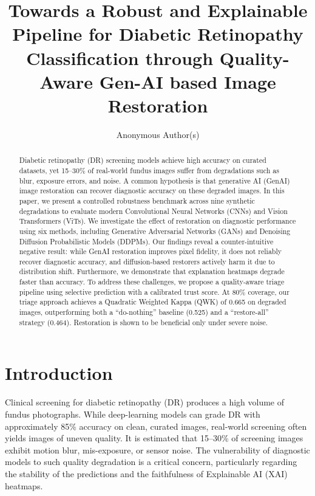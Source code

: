 \documentclass[runningheads]{llncs}
\begin{document}
\title{Towards a Robust and Explainable Pipeline for Diabetic Retinopathy Classification through Quality-Aware Gen-AI based Image Restoration}

\author{Anonymous Author(s)}

\maketitle

\begin{abstract}
Diabetic retinopathy (DR) screening models achieve high accuracy on curated datasets, yet 15--30\% of real-world fundus images suffer from degradations such as blur, exposure errors, and noise. A common hypothesis is that generative AI (GenAI) image restoration can recover diagnostic accuracy on these degraded images. In this paper, we present a controlled robustness benchmark across nine synthetic degradations to evaluate modern Convolutional Neural Networks (CNNs) and Vision Transformers (ViTs). We investigate the effect of restoration on diagnostic performance using six methods, including Generative Adversarial Networks (GANs) and Denoising Diffusion Probabilistic Models (DDPMs). Our findings reveal a counter-intuitive negative result: while GenAI restoration improves pixel fidelity, it does not reliably recover diagnostic accuracy, and diffusion-based restorers actively harm it due to distribution shift. Furthermore, we demonstrate that explanation heatmaps degrade faster than accuracy. To address these challenges, we propose a quality-aware triage pipeline using selective prediction with a calibrated trust score. At 80\% coverage, our triage approach achieves a Quadratic Weighted Kappa (QWK) of 0.665 on degraded images, outperforming both a ``do-nothing'' baseline (0.525) and a ``restore-all'' strategy (0.464). Restoration is shown to be beneficial only under severe noise.

\end{abstract}

\section{Introduction}
Clinical screening for diabetic retinopathy (DR) produces a high volume of fundus photographs. While deep-learning models can grade DR with approximately 85\% accuracy on clean, curated images, real-world screening often yields images of uneven quality. It is estimated that 15--30\% of screening images exhibit motion blur, mis-exposure, or sensor noise. The vulnerability of diagnostic models to such quality degradation is a critical concern, particularly regarding the stability of the predictions and the faithfulness of Explainable AI (XAI) heatmaps.
\end{document}
